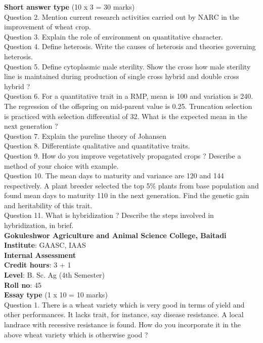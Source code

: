 \documentclass[12pt]{article}\usepackage[]{graphicx}\usepackage[]{color}
\begin{document}
\textbf{Short answer type} (10 x 3 = 30 marks) \\
Question 2. Mention current research activities carried out by NARC in the improvement of wheat crop.\\
Question 3. Explain the role of environment on quantitative character.\\
Question 4. Define heterosis. Write the causes of heterosis and theories governing heterosis.\\
Question 5. Define cytoplasmic male sterility. Show the cross how male sterility line is maintained during production of single cross hybrid and double cross hybrid ?\\
Question 6. For a quantitative trait in a RMP, mean is 100 and variation is 240. The regression of the offspring on mid-parent value is 0.25. Truncation selection is practiced with selection differential of 32. What is the expected mean in the next generation ?\\
Question 7. Explain the pureline theory of Johansen\\
Question 8. Differentiate qualitative and quantitative traits.\\
Question 9. How do you improve vegetatively propagated crops ? Describe a method of your choice with example.\\
Question 10. The mean days to maturity and variance are 120 and 144 respectively. A plant breeder selected the top 5\% plants from base population and found mean days to maturity 110 in the next generation. Find the genetic gain and heritability of this trait.\\
Question 11. What is hybridization ? Describe the steps involved in hybridization, in brief.\\
\clearpage 
{\centering \Large{\textbf{Gokuleshwor Agriculture and Animal Science College, Baitadi}} \\[0.25cm]
            \textbf{Institute}: GAASC, IAAS \\[0.2cm]
            \textbf{Internal Assessment} \\[0.2cm]} 
\textbf{Credit hours}: 3 + 1 \\ 
\textbf{Level}: B. Sc. Ag (4th Semester) \\
\textbf{Roll no}: 45 \\[0.5cm] 
\textbf{Essay type} (1 x 10 = 10 marks) \\
Question 1. There is a wheat variety which is very good in terms of yield and other performances. It lacks trait, for instance, say disease resistance. A local landrace with recessive resistance is found. How do you incorporate it in the above wheat variety which is otherwise good ?\\
\end{document}
